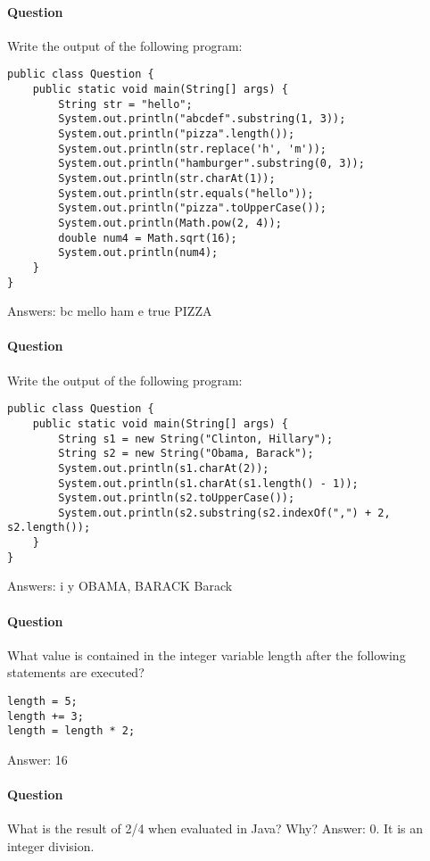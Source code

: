 \documentclass{article}
\begin{document}
\paragraph{Question }
Write the output of the following program:
\begin{lstlisting}
public class Question {
	public static void main(String[] args) {
		String str = "hello";
		System.out.println("abcdef".substring(1, 3));
		System.out.println("pizza".length());
		System.out.println(str.replace('h', 'm'));
		System.out.println("hamburger".substring(0, 3));
		System.out.println(str.charAt(1));
		System.out.println(str.equals("hello"));
		System.out.println("pizza".toUpperCase());
		System.out.println(Math.pow(2, 4));
		double num4 = Math.sqrt(16);
		System.out.println(num4);
	}
}
\end{lstlisting}
{\color{red}Answers:
\newline bc
\newline mello
\newline ham
\newline e
\newline true
\newline PIZZA
}


\addtocounter{question_num}{1}
\paragraph{Question }
Write the output of the following program:
\begin{lstlisting}
public class Question {
	public static void main(String[] args) {
		String s1 = new String("Clinton, Hillary");
		String s2 = new String("Obama, Barack");
		System.out.println(s1.charAt(2));
		System.out.println(s1.charAt(s1.length() - 1));
		System.out.println(s2.toUpperCase());
		System.out.println(s2.substring(s2.indexOf(",") + 2, s2.length());
	}
}
\end{lstlisting}
{\color{red}Answers:
\newline i
\newline y
\newline OBAMA, BARACK
\newline Barack
}

\addtocounter{question_num}{1}
\paragraph{Question }
What value is contained in the integer variable length after the following statements are executed?
\begin{lstlisting}
length = 5;
length += 3;
length = length * 2;
\end{lstlisting}
{\color{red}Answer: 16}

\addtocounter{question_num}{1}
\paragraph{Question }
What is the result of 2/4 when evaluated in Java? Why?
{\color{red}Answer: 0. It is an integer division.}
\end{document}
